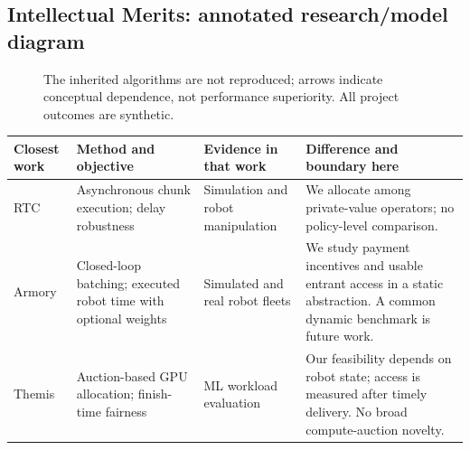 \subsection{Intellectual Merits: annotated research/model diagram}
\begin{figure}[h]\centering
{}
\caption{The inherited algorithms are not reproduced; arrows indicate conceptual dependence, not performance superiority. All project outcomes are synthetic.}
\end{figure}
\small
\noindent\begin{tabularx}{\textwidth}{p{}YYY}\toprule
Closest work & Method and objective & Evidence in that work & Difference and boundary here\\\midrule
RTC & Asynchronous chunk execution; delay robustness & Simulation and robot manipulation & We allocate among private-value operators; no policy-level comparison.\\
Armory & Closed-loop batching; executed robot time with optional weights & Simulated and real robot fleets & We study payment incentives and usable entrant access in a static abstraction. A common dynamic benchmark is future work.\\
Themis & Auction-based GPU allocation; finish-time fairness & ML workload evaluation & Our feasibility depends on robot state; access is measured after timely delivery. No broad compute-auction novelty.\\\bottomrule
\end{tabularx}
\normalsize
